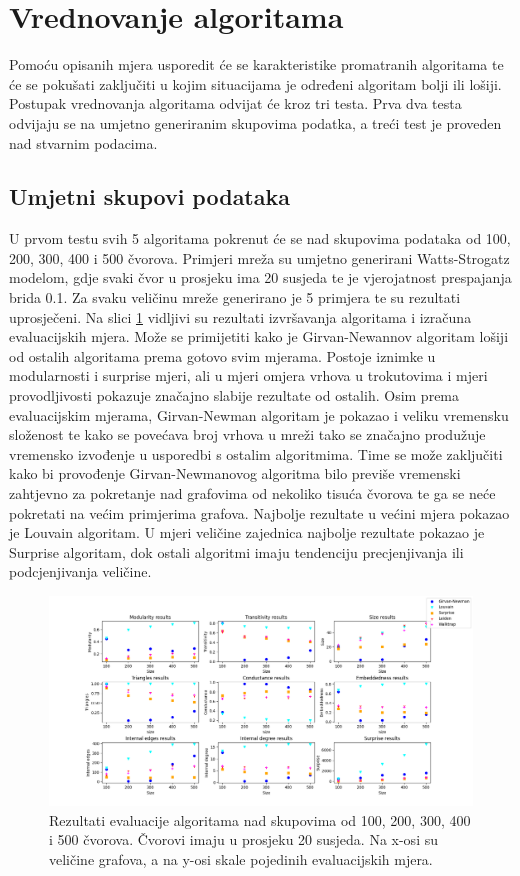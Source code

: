 \documentclass[times, utf8, diplomski]{fer}
\begin{document}
\section{Vrednovanje algoritama}
Pomoću opisanih mjera usporedit će se karakteristike promatranih algoritama te će se pokušati zaključiti u kojim situacijama je određeni algoritam bolji ili lošiji. Postupak vrednovanja algoritama odvijat će kroz tri testa.  Prva dva testa odvijaju se na umjetno generiranim skupovima podatka, a treći test je proveden nad stvarnim podacima.

\subsection{Umjetni skupovi podataka}
U prvom testu svih 5 algoritama pokrenut će se nad skupovima podataka od 100, 200, 300, 400 i 500 čvorova. Primjeri mreža su umjetno generirani Watts-Strogatz modelom, gdje svaki čvor u prosjeku ima 20 susjeda te je vjerojatnost prespajanja brida 0.1. Za svaku veličinu mreže generirano je 5 primjera te su rezultati uprosječeni. Na slici \ref{fig:test1} vidljivi su rezultati izvršavanja algoritama i izračuna evaluacijskih mjera. Može se primijetiti kako je Girvan-Newannov algoritam lošiji od ostalih algoritama prema gotovo svim mjerama. Postoje iznimke u modularnosti i surprise mjeri, ali u mjeri omjera vrhova u trokutovima i  mjeri provodljivosti pokazuje značajno slabije rezultate od ostalih. Osim prema evaluacijskim mjerama, Girvan-Newman algoritam je pokazao i veliku vremensku složenost te kako se povećava broj vrhova u mreži tako se značajno produžuje vremensko izvođenje u usporedbi s ostalim algoritmima. Time se može zaključiti kako bi provođenje Girvan-Newmanovog algoritma bilo previše vremenski zahtjevno za pokretanje nad grafovima od nekoliko tisuća čvorova te ga se neće pokretati na većim primjerima grafova. Najbolje rezultate u većini mjera pokazao je Louvain algoritam. U mjeri veličine zajednica najbolje rezultate pokazao je Surprise algoritam, dok ostali algoritmi imaju tendenciju precjenjivanja ili podcjenjivanja veličine.

\begin{figure}
	\includegraphics[width=\linewidth]{images/test1.png}
	\caption{Rezultati evaluacije algoritama nad skupovima od 100, 200, 300, 400 i 500 čvorova. Čvorovi imaju u prosjeku 20 susjeda. Na x-osi su veličine grafova, a na y-osi skale pojedinih evaluacijskih mjera.}
	\label{fig:test1}
\end{figure}
\end{document}
